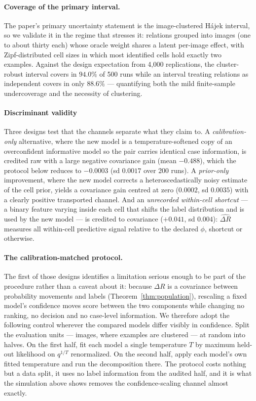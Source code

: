 \paragraph{Coverage of the primary interval.} The paper's primary uncertainty statement is
the image-clustered H\'ajek interval, so we validate it in the regime that stresses it:
relations grouped into images (one to about thirty each) whose oracle weight shares a latent
per-image effect, with Zipf-distributed cell sizes in which most identified cells hold
exactly two examples. Against the design expectation from 4{,}000 replications, the
cluster-robust interval covers in $94.0\%$ of 500 runs while an interval treating relations
as independent covers in only $88.6\%$ --- quantifying both the mild finite-sample
undercoverage and the necessity of clustering.

\paragraph{Discriminant validity} Three designs test that the channels separate what they
claim to. A \emph{calibration-only} alternative, where the new model is a
temperature-softened copy of an overconfident informative model so the pair carries identical
case information, is credited raw with a large negative covariance gain (mean $-0.488$),
which the protocol below reduces to $-0.0003$ (sd $0.0017$ over 200 runs). A
\emph{prior-only} improvement, where the new model corrects a heteroscedastically noisy
estimate of the cell prior, yields a covariance gain centred at zero ($0.0002$, sd $0.0035$)
with a clearly positive transported channel. And an \emph{unrecorded within-cell shortcut}
--- a binary feature varying inside each cell that shifts the label distribution and is used
by the new model --- is credited to covariance ($+0.041$, sd $0.004$): $\widehat{\Delta R}$ measures all
within-cell predictive signal relative to the declared $\phi$, shortcut or otherwise.

\paragraph{The calibration-matched protocol.} The first of those designs identifies a
limitation serious enough to be part of the procedure rather than a caveat about it: because
$\Delta R$ is a covariance between probability movements and labels
(Theorem~\ref{thm:population}), rescaling a fixed model's confidence moves score between the
two components while changing no ranking, no decision and no case-level information. We
therefore adopt the following control wherever the compared models differ visibly in
confidence. Split the evaluation units --- images, where
examples are clustered --- at random into halves. On the first half, fit each model a
single temperature $T$ by maximum held-out likelihood on $q^{1/T}$ renormalized. On the
second half, apply each model's own fitted temperature and run the decomposition there.
The protocol costs nothing but a data split, it uses no label information from the
audited half, and it is what the simulation above shows removes the confidence-scaling
channel almost exactly.


